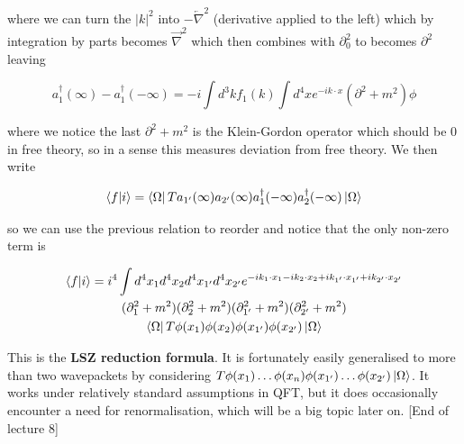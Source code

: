 \documentclass{article}
\theoremstyle{definition}
\begin{document}
where we can turn the $|k|^2$ into $-\overleftarrow{\nabla}^2$ (derivative
applied to the left) which by integration by parts becomes $\vec{\nabla}^2$
which then combines with $\partial_0^2$ to becomes $\partial^2$ leaving

\begin{equation}
  a_1^\dagger(\infty) - a_1^\dagger(-\infty) = -i \int d^3k f_1(k)
  \int d^4x e^{-ik \cdot x} (\partial^2 + m^2) \phi
\end{equation}

where we notice the last $\partial^2 + m^2$ is the Klein-Gordon operator which
should be 0 in free theory, so in a sense this measures deviation from free
theory. We then write

\begin{equation}
  \bra{f} \ket{i} = \bra{\Omega} T a_{1'} (\infty) a_{2'}(\infty)
  a_1^\dagger(-\infty) a_2^\dagger(-\infty) \ket{\Omega}
\end{equation}

so we can use the previous relation to reorder and notice that the only non-zero
term is

\begin{multline}
  \bra{f} \ket{i} = i^4 \int d^4x_1 d^4x_2 d^4x_{1'} d^4x_{2'}
  e^{-ik_1 \cdot x_1 - ik_2 \cdot x_2 + ik_{1'} \cdot x_{1'} + ik_{2'} \cdot
    x_{2'}} \\
  (\partial_1^2 + m^2) (\partial_2^2 + m^2) (\partial_{1'}^2 + m^2)
  (\partial_{2'}^2 + m^2) \\
  \bra{\Omega} T\phi(x_1) \phi(x_2) \phi(x_{1'}) \phi(x_{2'}) \ket{\Omega}
\end{multline}

This is the \textbf{LSZ reduction formula}. It is fortunately easily generalised
to more than two wavepackets by considering $T \phi(x_1) \dots \phi(x_n)
\phi(x_{1'}) \dots \phi(x_{2'}) \ket{\Omega}$. It works under relatively
standard assumptions in QFT, but it does occasionally encounter a need for
renormalisation, which will be a big topic later on. [End of lecture 8]
\end{document}
